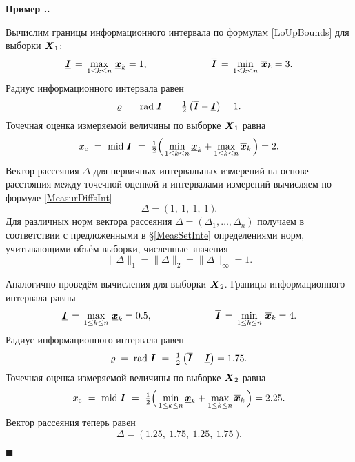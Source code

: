 \documentclass[a5paper,openany]{book}
\newcommand{\mbf}[1]{\protect\text{\boldmath$#1$}}
\newcommand{\ov}{\overline}
\newcommand{\un}{\underline}
\newcommand{\m}{\mathrm{mid}\;}
\renewcommand{\r}{\mathrm{rad}\;}
\newcounter{ExmpNum}[section]
\renewcommand{\theExmpNum}{\thesection.\arabic{ExmpNum}}
\newenvironment{example}%
  {\refstepcounter{ExmpNum}%
  \par\addvspace{\medskipamount} 
  \noindent\textbf{Пример {\theExmpNum}.}
  }%
  {\hfill$\blacksquare$\par\medskip}
\begin{document}
\begin{example}
  
Вычислим границы информационного интервала по формулам \eqref{LoUpBounds} 
для выборки $\mbf{X}_1$: 
\begin{equation*}
\label{LoUpBounds1} 
\un{\mbf{I}} \, = \,\max_{1\leq k\leq n} \,\un{\mbf{x}}_{k} = 1, 
\hspace{23mm} 
\ov{\mbf{I}} \, = \,\min_{1\leq k\leq n} \,\ov{\mbf{x}}_{k} = 3. 
\end{equation*}                    
Радиус информационного интервала равен
\begin{equation*}
\varrho\; = \;\r\mbf{I} \  = \ 
  \tfrac{1}{2}\,\bigl(\ov{\mbf{I}} - \un{\mbf{I}} \bigr) = 1. 
\end{equation*} 
Точечная оценка измеряемой величины по выборке $\mbf{X}_1$ равна 
\begin{equation*}
x_\text{c} \  = \  \m\mbf{I} \   
= \  \tfrac{1}{2} \Bigl(\,\min_{1\leq k\leq n} \un{\mbf{x}}_{k} + 
\max_{1\leq k\leq n} \ov{\mbf{x}}_{k}\,\Bigr) = 2. 
\end{equation*} 
Вектор рассеяния $\Delta$ для первичных интервальных измерений на основе 
расстояния между точечной оценкой и интервалами измерений вычисляем по формуле 
\eqref{MeasurDiffsInt}
\begin{equation*}
\Delta = \ \bigl( \ 1, \ 1, \ 1, \ 1 \  \bigr).
\end{equation*}
Для различных норм  вектора рассеяния  $\Delta = 
(\Delta_{1},\dots,\Delta_{n})$  получаем в соответствии с предложенными в \S\ref{MeasSetInte} определениями норм, учитывающими объём выборки, численные значения
\begin{equation*}
\|\Delta\|_1 = \|\Delta\|_2   =  \|\Delta\|_{\infty}= 1. 
\end{equation*}

Аналогично проведём вычисления для выборки $\mbf{X}_2$. Границы информационного интервала равны 
\begin{equation*}
	\label{LoUpBounds2} 
	\un{\mbf{I}} \, = \,\max_{1\leq k\leq n} \,\un{\mbf{x}}_{k} = 0.5, 
	\hspace{23mm} 
	\ov{\mbf{I}} \, = \,\min_{1\leq k\leq n} \,\ov{\mbf{x}}_{k} = 4. 
\end{equation*}                    
Радиус информационного интервала равен
\begin{equation*}
	\varrho\; = \;\r\mbf{I} \  = \ 
	\tfrac{1}{2}\,\bigl(\ov{\mbf{I}} - \un{\mbf{I}} \bigr) = 1.75.
\end{equation*} 
Точечная оценка измеряемой величины по выборке $\mbf{X}_2$ равна 
\begin{equation*}
	x_\text{c} \  = \  \m\mbf{I} \   
	= \  \tfrac{1}{2} \Bigl(\,\min_{1\leq k\leq n} \un{\mbf{x}}_{k} + 
	\max_{1\leq k\leq n} \ov{\mbf{x}}_{k}\,\Bigr) = 2.25. 
\end{equation*} 
Вектор рассеяния теперь равен
\begin{equation*}
\Delta = \  \bigl( \ 1.25, \ 1.75, \ 1.25, \ 1.75 \  \bigr).
\end{equation*}


\end{example}
\end{document}
